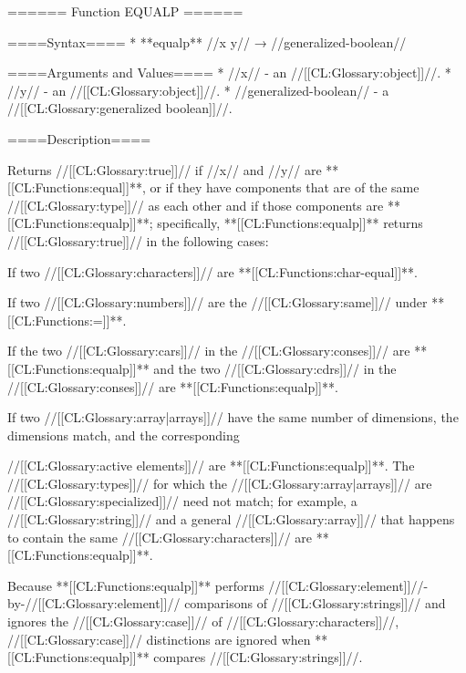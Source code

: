 ====== Function EQUALP ======

====Syntax====
  * **equalp** //x y// → //generalized-boolean//

====Arguments and Values====
  * //x// - an //[[CL:Glossary:object]]//.
  * //y// - an //[[CL:Glossary:object]]//.
  * //generalized-boolean// - a //[[CL:Glossary:generalized boolean]]//.

====Description====

Returns //[[CL:Glossary:true]]// if //x// and //y// are **[[CL:Functions:equal]]**, or if they have components that are of the same //[[CL:Glossary:type]]// as each other and if those components are **[[CL:Functions:equalp]]**; specifically, **[[CL:Functions:equalp]]** returns //[[CL:Glossary:true]]// in the following cases: \beginlist {}

If two //[[CL:Glossary:characters]]// are **[[CL:Functions:char-equal]]**.


If two //[[CL:Glossary:numbers]]// are the //[[CL:Glossary:same]]// under **[[CL:Functions:=]]**.


If the two //[[CL:Glossary:cars]]// in the //[[CL:Glossary:conses]]// are **[[CL:Functions:equalp]]** and the two //[[CL:Glossary:cdrs]]// in the //[[CL:Glossary:conses]]// are **[[CL:Functions:equalp]]**.


If two //[[CL:Glossary:array|arrays]]// have the same number of dimensions, the dimensions match, and the corresponding

//[[CL:Glossary:active elements]]// are **[[CL:Functions:equalp]]**. The //[[CL:Glossary:types]]// for which the //[[CL:Glossary:array|arrays]]// are //[[CL:Glossary:specialized]]// need not match; for example, a //[[CL:Glossary:string]]// and a general //[[CL:Glossary:array]]// that happens to contain the same //[[CL:Glossary:characters]]// are **[[CL:Functions:equalp]]**.

Because **[[CL:Functions:equalp]]** performs //[[CL:Glossary:element]]//-by-//[[CL:Glossary:element]]// comparisons of //[[CL:Glossary:strings]]// and ignores the //[[CL:Glossary:case]]// of //[[CL:Glossary:characters]]//, //[[CL:Glossary:case]]// distinctions are ignored when **[[CL:Functions:equalp]]** compares //[[CL:Glossary:strings]]//.


